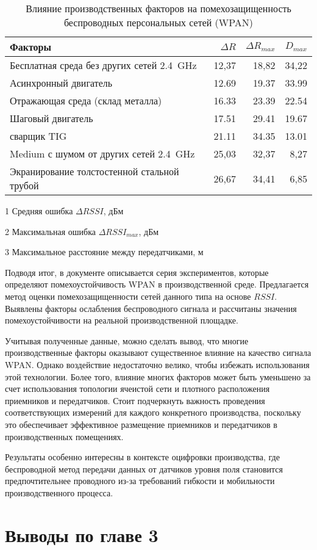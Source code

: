 \begin{table} [!ht]
\centering
\caption{Влияние производственных факторов на помехозащищенность беспроводных персональных сетей (WPAN)} \vspace{4pt}
\label{tab-2}
\begin{threeparttable}
\begin{tabularx}{\linewidth}{@{} lrrr}
	\toprule
	\textbf{Факторы} &
	{\scriptsize $\Delta R$} \tnote{1} &
	{\scriptsize $\Delta R_{max}$} \tnote{2} &
	{\scriptsize $D_{max}$} \tnote{3} \\
	\midrule
	\scriptsize Бесплатная среда без других сетей \SI{2,4}{\giga\hertz} & 12,37 & 18,82 & 34,22 \\
	\scriptsize Асинхронный двигатель & 12.69 & 19.37 & 33.99 \\
	\scriptsize Отражающая среда (склад металла) & 16.33 & 23.39 & 22.54 \\
	\scriptsize Шаговый двигатель & 17.51 & 29.41 & 19.67 \\
	\scriptsize сварщик TIG & 21.11 & 34.35 & 13.01 \\
	\scriptsize Medium с шумом от других сетей \SI{2,4}{\giga\hertz} & 25,03 & 32,37 & 8,27 \\
	\scriptsize Экранирование толстостенной стальной трубой & 26,67 & 34,41 & 6,85 \\
	\bottomrule
\end{tabularx}
\begin{tablenotes} \footnotesize
	\item [1] Средняя ошибка $\Delta RSSI$, дБм
	\item [2] Максимальная ошибка $\Delta RSSI_{max}$, дБм
	\item [3] Максимальное расстояние между передатчиками, м
\end{tablenotes}
\end{threeparttable}
\end{table}

Подводя итог, в документе описывается серия экспериментов, которые определяют помехоустойчивость WPAN в производственной среде. Предлагается метод оценки помехозащищенности сетей данного типа на основе $RSSI$. Выявлены факторы ослабления беспроводного сигнала и рассчитаны значения помехоустойчивости на реальной производственной площадке.

Учитывая полученные данные, можно сделать вывод, что многие производственные факторы оказывают существенное влияние на качество сигнала WPAN. Однако воздействие недостаточно велико, чтобы избежать использования этой технологии. Более того, влияние многих факторов может быть уменьшено за счет использования топологии ячеистой сети и плотного расположения приемников и передатчиков. Стоит подчеркнуть важность проведения соответствующих измерений для каждого конкретного производства, поскольку это обеспечивает эффективное размещение приемников и передатчиков в производственных помещениях.

Результаты особенно интересны в контексте оцифровки производства, где беспроводной метод передачи данных от датчиков уровня поля становится предпочтительнее проводного из-за требований гибкости и мобильности производственного процесса.

\section{Выводы по главе 3}

\FloatBarrier